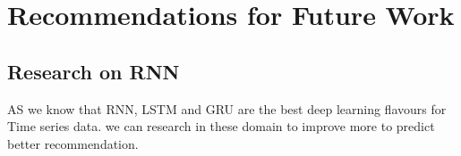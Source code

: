 \chapter{Recommendations for Future Work}
\section{Research on RNN}
AS we know that RNN, LSTM and GRU are the best deep learning flavours for Time series data. we can research in these domain to improve more to predict better recommendation. 
